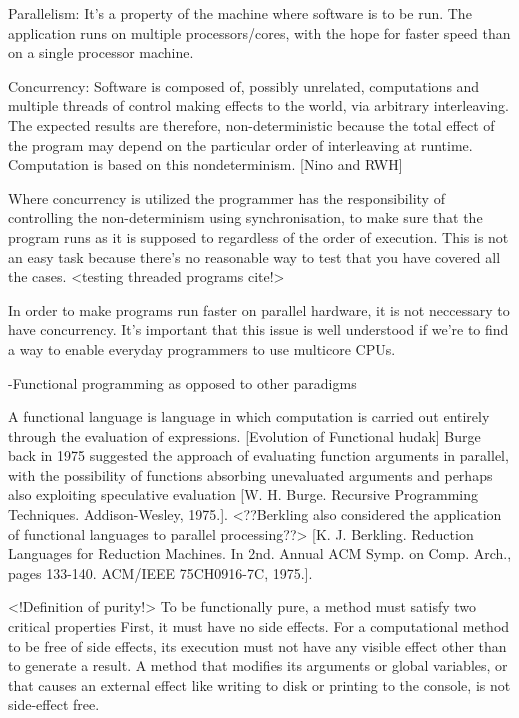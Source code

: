 \documentclass[main.tex]{subfiles}
\begin{document}
Parallelism: It’s a property of the machine where software is to be run. The application runs on multiple processors/cores, with the hope for faster speed than on a single processor machine.

Concurrency: Software is composed of, possibly unrelated, computations and multiple threads of control making effects to the world, via arbitrary interleaving. The expected results are therefore, non-deterministic because the total effect of the program may depend on the particular order of interleaving at runtime. Computation is based on this nondeterminism. [Nino and RWH]

Where concurrency is utilized the programmer has the responsibility of controlling the non-determinism using synchronisation, to make sure that the program runs as it is supposed to regardless of the order of execution. This is not an easy task because there’s no reasonable way to test that you have covered all the cases. <testing threaded programs cite!>

In order to make programs run faster on parallel hardware, it is not neccessary to have concurrency.
It’s important that this issue is well understood if we’re to find a way to enable everyday programmers to use multicore CPUs.


-Functional programming as opposed to other paradigms

A functional language is language  in  which  computation  is  carried  out  entirely  through  the evaluation  of  expressions. [Evolution of Functional hudak] Burge back in 1975 suggested the approach of evaluating function arguments in parallel, with the possibility of functions absorbing unevaluated arguments and perhaps also exploiting speculative evaluation [W. H. Burge. Recursive Programming Techniques. Addison-Wesley, 1975.]. <??Berkling also considered the application of functional languages to parallel processing??> [K. J. Berkling. Reduction Languages for Reduction Machines. In 2nd. Annual ACM Symp. on Comp. Arch., pages 133-140. ACM/IEEE 75CH0916-7C, 1975.].

<!Definition of purity!>
To be functionally pure, a method must satisfy two critical properties
First, it must have no side effects. For a computational method to be free of side effects, its execution must not have any visible effect other than to generate a result. A method that modiﬁes its arguments or global variables, or that causes an external effect like writing to disk or printing to the console, is not side-effect free.
\end{document}
